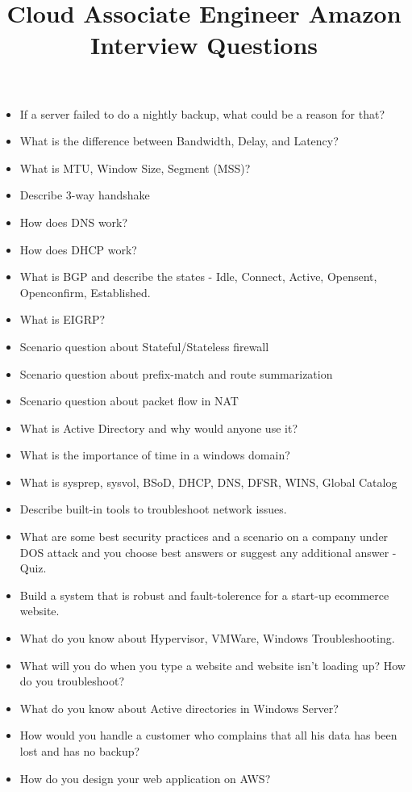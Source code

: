 \documentclass{article}
\begin{document}
\title{Cloud Associate Engineer Amazon Interview Questions}
\maketitle
\begin{itemize}
	\item If a server failed to do a nightly backup, what could be a reason for that?
	\item What is the difference between Bandwidth, Delay, and Latency?
	\item What is MTU, Window Size, Segment (MSS)?
	\item Describe 3-way handshake
	\item How does DNS work?
	\item How does DHCP work?
	\item What is BGP and describe the states - Idle, Connect, Active, Opensent, Openconfirm, Established.
	\item What is EIGRP?
	\item Scenario question about Stateful/Stateless firewall
	\item Scenario question about prefix-match and route summarization
	\item Scenario question about packet flow in NAT
	\item What is Active Directory and why would anyone use it?
	\item What is the importance of time in a windows domain?
	\item What is sysprep, sysvol, BSoD, DHCP, DNS, DFSR, WINS, Global Catalog
	\item Describe built-in tools to troubleshoot network issues.
	\item What are some best security practices and a scenario on a company under DOS attack and you choose best answers or suggest any additional answer - Quiz.
	\item Build a system that is robust and fault-tolerence for a start-up ecommerce website.
	\item What do you know about Hypervisor, VMWare, Windows Troubleshooting.
	\item What will you do when you type a website and website isn't loading up? How do you troubleshoot?
	\item What do you know about Active directories in Windows Server?
	\item How would you handle a customer who complains that all his data has been lost and has no backup?
	\item How do you design your web application on AWS?

\end{itemize}
\end{document}
